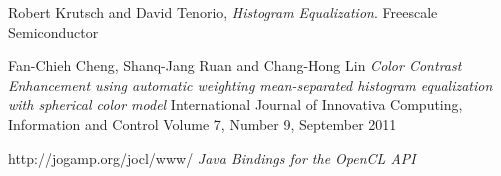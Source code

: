 \documentclass[12pt,spanish]{article}
\begin{document}
\begin{thebibliography}{9}

  Robert Krutsch and David Tenorio,
  \emph{Histogram Equalization}.
  Freescale Semiconductor

  Fan-Chieh Cheng, Shanq-Jang Ruan and Chang-Hong Lin
  \emph{Color Contrast Enhancement using automatic weighting mean-separated histogram equalization with spherical color model}
  International Journal of Innovativa Computing, Information and Control
  Volume 7, Number 9, September 2011

  http://jogamp.org/jocl/www/
  \emph{Java Bindings for the OpenCL API}
  

\end{thebibliography}
\end{document}
